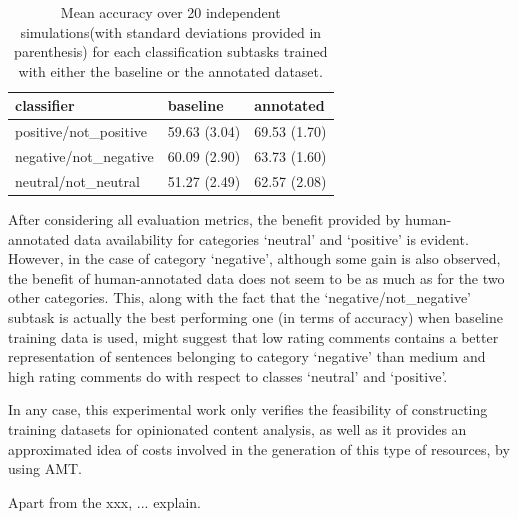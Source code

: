 \documentclass[11pt,letterpaper]{article}
\begin{document}
\begin{table}
\begin{tabular}{|l|l|l|}
\hline
classifier &baseline &annotated \\ 
\hline
positive/not\_positive &59.63 (3.04) &69.53 (1.70) \\ 
\hline
negative/not\_negative &60.09 (2.90) &63.73 (1.60) \\ 
\hline
neutral/not\_neutral &51.27 (2.49) &62.57 (2.08) \\ 
\hline
\end{tabular}
\caption{Mean accuracy over 20 independent simulations(with standard deviations provided in parenthesis) 
for each classification subtasks trained with either the baseline or the annotated dataset.}
\label{tc_accu}
\end{table}

After considering all evaluation metrics, the benefit provided by human-annotated data 
availability for categories `neutral' and `positive' is evident. However, in the case of category `negative', although some 
gain is also observed, the benefit of human-annotated data does not seem to be as much as for the two other 
categories. This, along with the fact that the `negative/not\_negative' subtask is actually the best performing
one (in terms of accuracy) when baseline training data is used, might suggest that low rating comments contains 
a better representation of sentences belonging to category `negative' than medium and high rating comments do with
respect to classes `neutral' and `positive'. 

In any case, this experimental work only verifies the feasibility of constructing training datasets for
opinionated content analysis, as well as it provides an approximated idea of costs involved in the generation
of this type of resources, by using AMT.


Apart from the xxx, ... explain.
\end{document}
